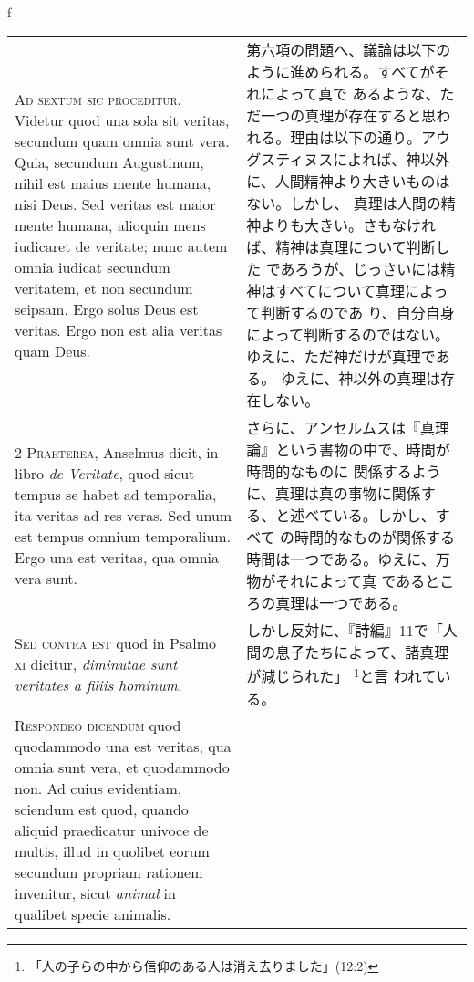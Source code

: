 \\f\documentclass[10pt]{jsarticle} %
\begin{document}
\begin{longtable}{p{21em}p{21em}}

{\huge A}{\scshape d sextum sic proceditur}. Videtur quod una sola sit
veritas, secundum quam omnia sunt vera. Quia, secundum Augustinum,
nihil est maius mente humana, nisi Deus. Sed veritas est maior mente
humana, alioquin mens iudicaret de veritate; nunc autem omnia iudicat
secundum veritatem, et non secundum seipsam. Ergo solus Deus est
veritas. Ergo non est alia veritas quam Deus.

&

第六項の問題へ、議論は以下のように進められる。すべてがそれによって真で
あるような、ただ一つの真理が存在すると思われる。理由は以下の通り。アウ
グスティヌスによれば、神以外に、人間精神より大きいものはない。しかし、
真理は人間の精神よりも大きい。さもなければ、精神は真理について判断した
であろうが、じっさいには精神はすべてについて真理によって判断するのであ
り、自分自身によって判断するのではない。ゆえに、ただ神だけが真理である。
ゆえに、神以外の真理は存在しない。

\\

2 {\scshape Praeterea}, Anselmus dicit, in libro {\itshape de
Veritate}, quod sicut tempus se habet ad temporalia, ita veritas ad
res veras. Sed unum est tempus omnium temporalium. Ergo una est
veritas, qua omnia vera sunt.

&

さらに、アンセルムスは『真理論』という書物の中で、時間が時間的なものに
関係するように、真理は真の事物に関係する、と述べている。しかし、すべて
の時間的なものが関係する時間は一つである。ゆえに、万物がそれによって真
であるところの真理は一つである。

\\

{\scshape Sed contra est} quod in Psalmo {\scshape xi} dicitur,
{\itshape diminutae sunt veritates a filiis hominum}.


&

しかし反対に、『詩編』11で「人間の息子たちによって、諸真理が減じられた」
\footnote{「人の子らの中から信仰のある人は消え去りました」(12:2)}と言
われている。

\\

{\scshape Respondeo dicendum} quod quodammodo una est veritas, qua
omnia sunt vera, et quodammodo non. Ad cuius evidentiam, sciendum est
quod, quando aliquid praedicatur univoce de multis, illud in quolibet
eorum secundum propriam rationem invenitur, sicut {\itshape animal} in
qualibet specie animalis.


\end{longtable}
\end{document}
